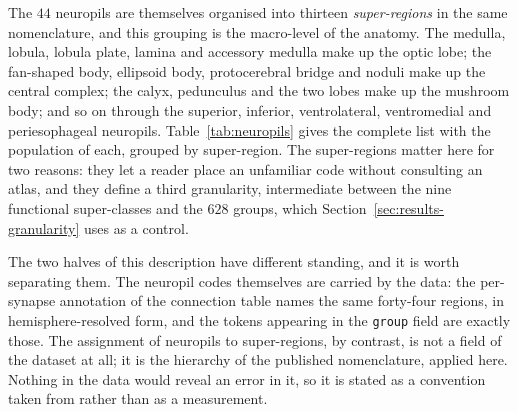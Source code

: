 \documentclass[12pt,a4paper,oneside]{article}
\theoremstyle{definition}
\theoremstyle{plain}
\newcommand{\code}[1]{\texttt{#1}}
\begin{document}
The $44$ neuropils are themselves organised into thirteen \emph{super-regions}
in the same nomenclature, and this grouping is the macro-level of the
anatomy. The medulla, lobula, lobula plate, lamina and accessory medulla make
up the optic lobe; the fan-shaped body, ellipsoid body, protocerebral bridge
and noduli make up the central complex; the calyx, pedunculus and the two
lobes make up the mushroom body; and so on through the superior, inferior,
ventrolateral, ventromedial and periesophageal neuropils. Table~\ref{tab:neuropils}
gives the complete list with the population of each, grouped by super-region.
The super-regions matter here for two reasons: they let a reader place an
unfamiliar code without consulting an atlas, and they define a third
granularity, intermediate between the nine functional super-classes and the
$628$ groups, which Section~\ref{sec:results-granularity} uses as a control.

The two halves of this description have different standing, and it is worth
separating them. The neuropil codes themselves are carried by the data: the
per-synapse annotation of the connection table names the same forty-four
regions, in hemisphere-resolved form, and the tokens appearing in the
\code{group} field are exactly those. The assignment of neuropils to
super-regions, by contrast, is not a field of the dataset at all; it is the
hierarchy of the published nomenclature, applied here. Nothing in the data
would reveal an error in it, so it is stated as a convention taken from
\cite{ito2014} rather than as a measurement.
\end{document}
